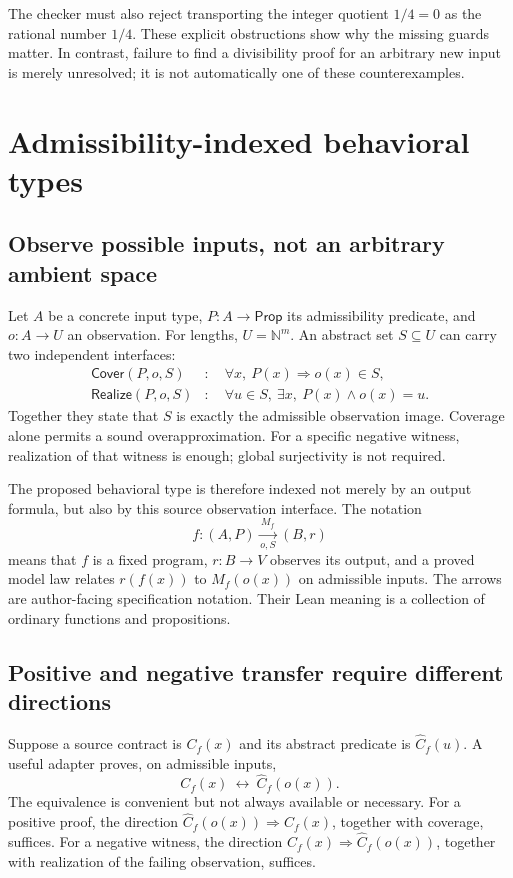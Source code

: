\documentclass[11pt,letterpaper]{article}
\newcommand{\N}{\mathbb N}\newcommand{\Z}{\mathbb Z}\newcommand{\Q}{\mathbb Q}\newcommand{\R}{\mathbb R}
\theoremstyle{definition}\newtheorem{definition}[theorem]{Definition}
\theoremstyle{remark}\newtheorem{remark}[theorem]{Remark}
\begin{document}
The checker must also reject transporting the integer quotient $1/4=0$ as the
rational number $1/4$. These explicit obstructions show why the missing guards
matter. In contrast, failure to find a divisibility proof for an arbitrary
new input is merely unresolved; it is not automatically one of these
counterexamples.

\section{Admissibility-indexed behavioral types}
\label{sec:behavior}

\subsection{Observe possible inputs, not an arbitrary ambient space}
Let $A$ be a concrete input type, $P:A\to\mathsf{Prop}$ its admissibility
predicate, and $o:A\to U$ an observation. For lengths, $U=\N^m$.
An abstract set $S\subseteq U$ can carry two independent interfaces:
\begin{align}
 \mathsf{Cover}(P,o,S)&:\quad
     \forall x,\ P(x)\Longrightarrow o(x)\in S,\label{eq:cover}\\
 \mathsf{Realize}(P,o,S)&:\quad
     \forall u\in S,\ \exists x,\ P(x)\wedge o(x)=u.\label{eq:realize}
\end{align}
Together they state that $S$ is exactly the admissible observation image.
Coverage alone permits a sound overapproximation. For a specific negative
witness, realization of that witness is enough; global surjectivity is not
required.

The proposed behavioral type is therefore indexed not merely by an output
formula, but also by this source observation interface. The notation
\[
 f:(A,P)\xrightarrow[o,S]{\,M_f\,}(B,r)
\]
means that $f$ is a fixed program, $r:B\to V$ observes its output, and a
proved model law relates $r(f(x))$ to $M_f(o(x))$ on admissible inputs. The
arrows are author-facing specification notation. Their Lean meaning is a
collection of ordinary functions and propositions.

\subsection{Positive and negative transfer require different directions}
Suppose a source contract is $C_f(x)$ and its abstract predicate is
$\widehat C_f(u)$. A useful adapter proves, on admissible inputs,
\[
 C_f(x)\ \longleftrightarrow\ \widehat C_f(o(x)).
\]
The equivalence is convenient but not always available or necessary.
For a positive proof, the direction
$\widehat C_f(o(x))\Rightarrow C_f(x)$, together with coverage, suffices.
For a negative witness, the direction
$C_f(x)\Rightarrow\widehat C_f(o(x))$, together with realization of the
failing observation, suffices.
\end{document}
